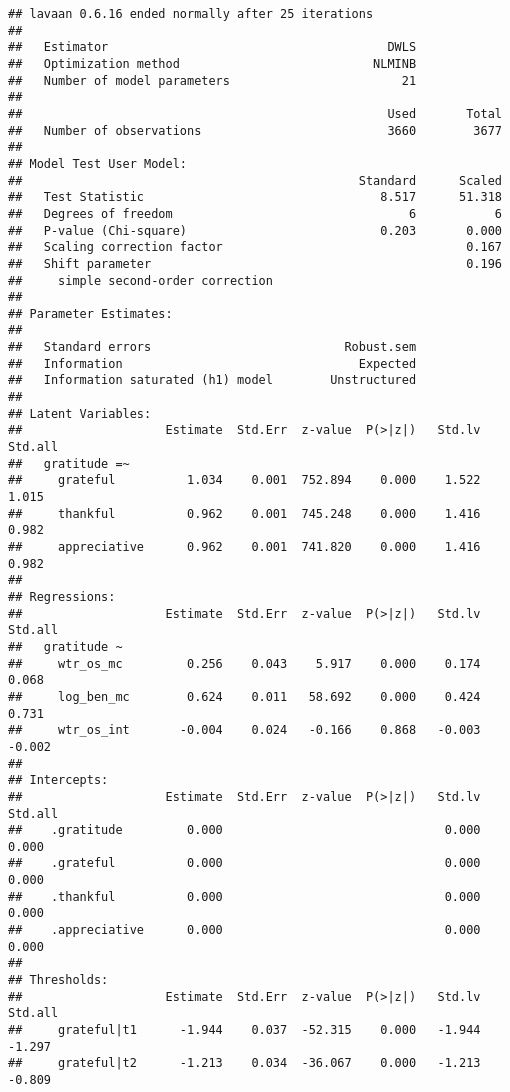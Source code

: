 \documentclass[
]{article}
\begin{document}
\begin{verbatim}
## lavaan 0.6.16 ended normally after 25 iterations
## 
##   Estimator                                       DWLS
##   Optimization method                           NLMINB
##   Number of model parameters                        21
## 
##                                                   Used       Total
##   Number of observations                          3660        3677
## 
## Model Test User Model:
##                                               Standard      Scaled
##   Test Statistic                                 8.517      51.318
##   Degrees of freedom                                 6           6
##   P-value (Chi-square)                           0.203       0.000
##   Scaling correction factor                                  0.167
##   Shift parameter                                            0.196
##     simple second-order correction                                
## 
## Parameter Estimates:
## 
##   Standard errors                           Robust.sem
##   Information                                 Expected
##   Information saturated (h1) model        Unstructured
## 
## Latent Variables:
##                    Estimate  Std.Err  z-value  P(>|z|)   Std.lv  Std.all
##   gratitude =~                                                          
##     grateful          1.034    0.001  752.894    0.000    1.522    1.015
##     thankful          0.962    0.001  745.248    0.000    1.416    0.982
##     appreciative      0.962    0.001  741.820    0.000    1.416    0.982
## 
## Regressions:
##                    Estimate  Std.Err  z-value  P(>|z|)   Std.lv  Std.all
##   gratitude ~                                                           
##     wtr_os_mc         0.256    0.043    5.917    0.000    0.174    0.068
##     log_ben_mc        0.624    0.011   58.692    0.000    0.424    0.731
##     wtr_os_int       -0.004    0.024   -0.166    0.868   -0.003   -0.002
## 
## Intercepts:
##                    Estimate  Std.Err  z-value  P(>|z|)   Std.lv  Std.all
##    .gratitude         0.000                               0.000    0.000
##    .grateful          0.000                               0.000    0.000
##    .thankful          0.000                               0.000    0.000
##    .appreciative      0.000                               0.000    0.000
## 
## Thresholds:
##                    Estimate  Std.Err  z-value  P(>|z|)   Std.lv  Std.all
##     grateful|t1      -1.944    0.037  -52.315    0.000   -1.944   -1.297
##     grateful|t2      -1.213    0.034  -36.067    0.000   -1.213   -0.809

\end{verbatim}
\end{document}
